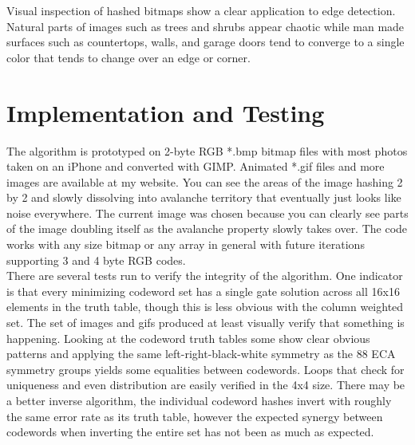 \documentclass[11pt]{article}
\begin{document}
Visual inspection of hashed bitmaps show a clear application to edge detection. Natural parts of images such as trees and shrubs appear chaotic while man made surfaces such as countertops, walls, and garage doors tend to converge to a single color that tends to change over an edge or corner.

\section{Implementation and Testing}

The algorithm is prototyped on 2-byte RGB *.bmp bitmap files with most photos taken on an iPhone and converted with GIMP. Animated *.gif files and more images are available at my website. You can see the areas of the image hashing 2 by 2 and slowly dissolving into avalanche territory that eventually just looks like noise everywhere. The current image was chosen because you can clearly see parts of the image doubling itself as the avalanche property slowly takes over. The code works with any size bitmap or any array in general with future iterations supporting 3 and 4 byte RGB codes. \\

There are several tests run to verify the integrity of the algorithm. One indicator is that every minimizing codeword set has a single gate solution across all 16x16 elements in the truth table, though this is less obvious with the column weighted set. The set of images and gifs produced at least visually verify that something is happening. Looking at the codeword truth tables some show clear obvious patterns and applying the same left-right-black-white symmetry as the 88 ECA symmetry groups \cite{Wolfram} yields some equalities between codewords. Loops that check for uniqueness and even distribution are easily verified in the 4x4 size. There may be a better inverse algorithm, the individual codeword hashes invert with roughly the same error rate as its truth table, however the expected synergy between codewords when inverting the entire set has not been as much as expected.\\
\end{document}
